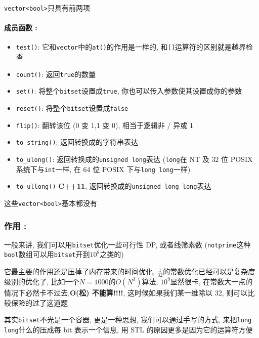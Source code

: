 \texttt{vector<bool>}只具有前两项

\paragraph{成员函数 :}

\begin{itemize}
\item \texttt{test()}: 它和\texttt{vector}中的\texttt{at()}的作用是一样的, 和\texttt{[]}运算符的区别就是越界检查
\item \texttt{count()}: 返回\texttt{true}的数量
\item \texttt{set()}: 将整个\texttt{bitset}设置成\texttt{true}, 你也可以传入参数使其设置成你的参数
\item \texttt{reset()}: 将整个\texttt{bitset}设置成\texttt{false}
\item \texttt{flip()}: 翻转该位 (0 变 1,1 变 0), 相当于逻辑非 / 异或 1
\item \texttt{to_string()}: 返回转换成的字符串表达
\item \texttt{to_ulong()}: 返回转换成的\texttt{unsigned long}表达 (\texttt{long}在 NT 及 32 位 POSIX 系统下与\texttt{int}一样,  在 64 位 POSIX 下与\texttt{long long}一样)
\item \texttt{to_ullong()} \textbf{C++11}, 返回转换成的\texttt{unsigned long long}表达
\end{itemize}

这些\texttt{vector<bool>}基本都没有

\subsubsection{作用 :}

一般来讲, 我们可以用\texttt{bitset}优化一些可行性 DP, 或者线筛素数 (\texttt{notprime}这种\texttt{bool}数组可以用\texttt{bitset}开到$10^8$之类的)

它最主要的作用还是压掉了内存带来的时间优化, $\frac{1}{32}$的常数优化已经可以是复杂度级别的优化了, 比如一个$N = 1000$的$O(N^3)$算法, $10^9$显然很卡, 在常数大一点的情况下必然卡不过去,\textbf{O(松) 不能算!!!!}, 这时候如果我们某一维除以 32, 则可以比较保险的过了这道题

其实\texttt{bitset}不光是一个容器, 更是一种思想, 我们可以通过手写的方式, 来把\texttt{long long}什么的压成每 bit 表示一个信息, 用 STL 的原因更多是因为它的运算符方便
